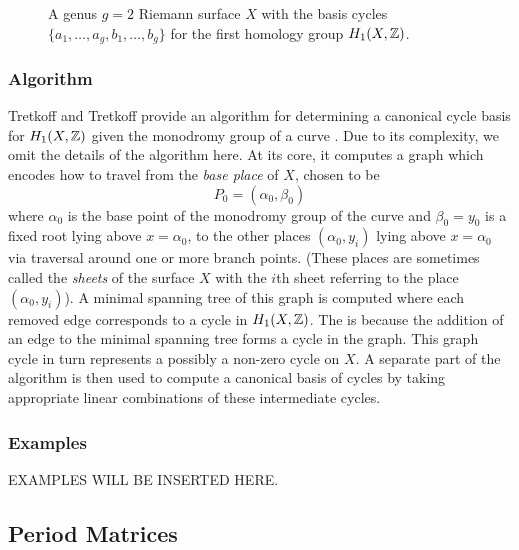 \begin{figure}
  \caption{A genus $g=2$ Riemann surface $X$ with the basis cycles
    $\{a_1,\ldots,a_g,b_1,\ldots,b_g\}$ for the first homology group
    $H_1(X,\operatorname{\mathbb{Z}})$.}
  \label{fig: cycle-basis}
\end{figure}


%
\subsubsection*{Algorithm}
%

Tretkoff and Tretkoff provide an algorithm for determining a canonical
cycle basis for $H_1(X,\operatorname{\mathbb{Z}})$ given the monodromy group of a curve
\cite{TretkoffTretkoff84}. Due to its complexity, we omit the details of
the algorithm here. At its core, it computes a graph which encodes how
to travel from the {\it base place} of $X$, chosen to be
\[
    P_0 = (\alpha_0, \beta_0)
\]
where $\alpha_0$ is the base point of the monodromy group of the curve
and $\beta_0 = y_0$ is a fixed root lying above $x = \alpha_0$, to the
other places $(\alpha_0, y_i)$ lying above $x = \alpha_0$ via traversal
around one or more branch points. (These places are sometimes called the
{\it sheets} of the surface $X$ with the $i$th sheet referring to the
place $(\alpha_0,y_i)$). A minimal spanning tree of this graph is
computed where each removed edge corresponds to a cycle in
$H_1(X,\operatorname{\mathbb{Z}})$. The is because the addition of an edge to the minimal
spanning tree forms a cycle in the graph. This graph cycle in turn
represents a possibly a non-zero cycle on $X$. A separate part of the
algorithm is then used to compute a canonical basis of cycles by taking
appropriate linear combinations of these intermediate cycles.

%
\subsubsection*{Examples}
%

\vspace{24pt}

EXAMPLES WILL BE INSERTED HERE.

\vspace{24pt}


\subsection{Period Matrices} \label{sec: period-matrices}

